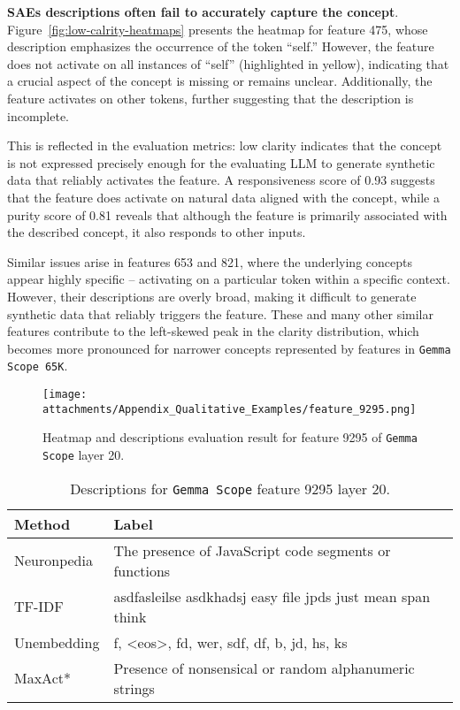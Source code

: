 \textbf{SAEs descriptions often fail to accurately capture the concept}. Figure~\ref{fig:low-calrity-heatmaps} presents the heatmap for feature 475, whose description emphasizes the occurrence of the token ``self.'' However, the feature does not activate on all instances of ``self'' (highlighted in yellow), indicating that a crucial aspect of the concept is missing or remains unclear. Additionally, the feature activates on other tokens, further suggesting that the description is incomplete.

This is reflected in the evaluation metrics: low clarity indicates that the concept is not expressed precisely enough for the evaluating LLM to generate synthetic data that reliably activates the feature. A responsiveness score of 0.93 suggests that the feature does activate on natural data aligned with the concept, while a purity score of 0.81 reveals that although the feature is primarily associated with the described concept, it also responds to other inputs.

Similar issues arise in features 653 and 821, where the underlying concepts appear highly specific -- activating on a particular token within a specific context. However, their descriptions are overly broad, making it difficult to generate synthetic data that reliably triggers the feature. These and many other similar features contribute to the left-skewed peak in the clarity distribution, which becomes more pronounced for narrower concepts represented by features in \texttt{Gemma Scope 65K}.

\begin{figure}[t]
    \centering
    \texttt{[image: attachments/Appendix\_Qualitative\_Examples/feature\_9295.png]}
    \caption{Heatmap and descriptions evaluation result for feature 9295 of \texttt{Gemma Scope} layer 20.}
    \label{fig:feature9295}
\end{figure}

\begin{table}[h]
\scriptsize
\centering
\begin{tabular}{p{1.5cm}p{5.5cm}}
Method & Label  \\ \hline \hline
Neuronpedia & The presence of JavaScript code segments or functions  \\
TF-IDF & asdfasleilse asdkhadsj easy file jpds just mean span think \\
Unembedding & f,  <eos>, fd, wer, sdf, df, b, jd, hs, ks\\
MaxAct* & Presence of nonsensical or random alphanumeric strings \\ \hline
\end{tabular}
\caption{Descriptions for \texttt{Gemma Scope} feature 9295 layer 20.}
\label{tab:feature9295}
\end{table}

